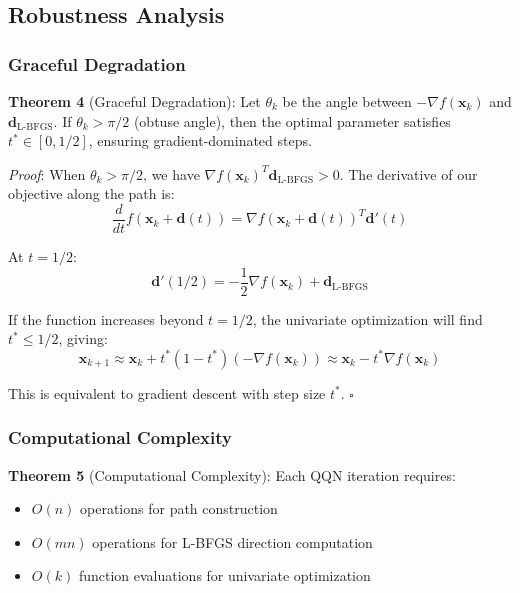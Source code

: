 \hypertarget{robustness-analysis}{%
\subsection{Robustness Analysis}\label{robustness-analysis}}

\hypertarget{graceful-degradation}{%
\subsubsection{Graceful Degradation}\label{graceful-degradation}}

\textbf{Theorem 4} (Graceful Degradation): Let \(\theta_k\) be the angle between \(-\nabla f(\mathbf{x}_k)\) and \(\mathbf{d}_{\text{L-BFGS}}\). If \(\theta_k > \pi/2\) (obtuse angle), then the optimal parameter satisfies \(t^* \in [0, 1/2]\), ensuring gradient-dominated steps.

\emph{Proof}: When \(\theta_k > \pi/2\), we have \(\nabla f(\mathbf{x}_k)^T \mathbf{d}_{\text{L-BFGS}} > 0\). The derivative of our objective along the path is:
\[\frac{d}{dt}f(\mathbf{x}_k + \mathbf{d}(t)) = \nabla f(\mathbf{x}_k + \mathbf{d}(t))^T \mathbf{d}'(t)\]

At \(t = 1/2\):
\[\mathbf{d}'(1/2) = -\frac{1}{2}\nabla f(\mathbf{x}_k) + \mathbf{d}_{\text{L-BFGS}}\]

If the function increases beyond \(t = 1/2\), the univariate optimization will find \(t^* \leq 1/2\), giving:
\[\mathbf{x}_{k+1} \approx \mathbf{x}_k + t^*(1-t^*)(-\nabla f(\mathbf{x}_k)) \approx \mathbf{x}_k - t^*\nabla f(\mathbf{x}_k)\]

This is equivalent to gradient descent with step size \(t^*\). \(\square\)

\hypertarget{computational-complexity}{%
\subsubsection{Computational Complexity}\label{computational-complexity}}

\textbf{Theorem 5} (Computational Complexity): Each QQN iteration requires:

\begin{itemize}
\tightlist
\item
  \(O(n)\) operations for path construction
\item
  \(O(mn)\) operations for L-BFGS direction computation
\item
  \(O(k)\) function evaluations for univariate optimization
\end{itemize}

